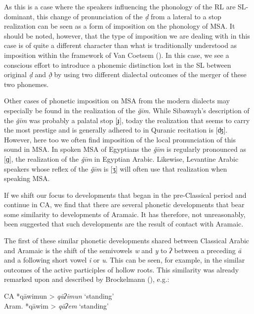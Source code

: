 \documentclass[output=paper]{langsci/langscibook}
\begin{document}
As this is a case where the speakers influencing the phonology of the RL are SL-dominant, this change of pronunciation of the \textit{ḍ} from a lateral to a stop realization can be seen as a form of imposition on the phonology of MSA. It should be noted, however, that the type of imposition we are dealing with in this case is of quite a different character than what is traditionally understood as imposition within the framework of Van Coetsem (\citeyear{VanCoetsem1988,VanCoetsem2000}). In this case, we see a conscious effort to introduce a phonemic distinction lost in the SL between original \textit{ḍ} and \textit{ð̣} by using two different dialectal outcomes of the merger of these two phonemes.

Other cases of phonetic imposition on MSA from the modern dialects may especially be found in the realization of the \textit{ǧīm}. While Sibawayh’s description of the \textit{ǧīm} was probably a palatal stop [ɟ], today the realization that seems to carry the most prestige and is generally adhered to in Quranic recitation is [ʤ]. However, here too we often find imposition of the local pronunciation of this sound in MSA. In spoken MSA of Egyptians the \textit{ǧīm} is regularly pronounced as [ɡ], the realization of the \textit{ǧīm} in Egyptian Arabic. Likewise, Levantine Arabic speakers whose reflex of the \textit{ǧīm} is [ʒ] will often use that realization when speaking MSA.

If we shift our focus to developments that began in the pre-Classical period and continue in CA, we find that there are several phonetic developments that bear some similarity to developments of Aramaic. It has therefore, not unreasonably, been suggested that such developments are the result of contact with Aramaic.

The first of these similar phonetic developments shared between Classical Arabic and Aramaic is the shift of the semivowels  \textit{w} and \textit{y} to \textit{ʔ} between a preceding \textit{ā} and a following short vowel \textit{i} or \textit{u}. This can be seen, for example, in the similar outcomes of the active participles of hollow roots. This similarity was already remarked upon and described by Brockelmann (\citeyear[138--139]{Brockelmann1908}), e.g.:

\ea
\ea CA *qāwimun > \textit{qāʔimun} ‘standing’\\
\ex Aram. *qāwim > \textit{qāʔem} ‘standing’
\z
\z
\end{document}
